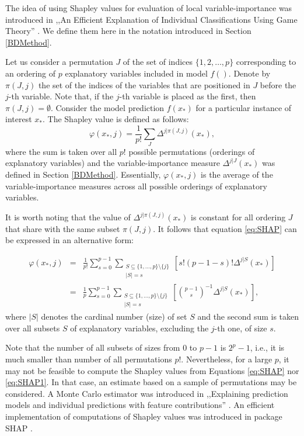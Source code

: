 \documentclass[]{krantz}
\begin{document}
The idea of using Shapley values for evaluation of local variable-importance was introduced in ,,An Efficient Explanation of Individual Classifications Using Game Theory'' \citep{imeJLMR}. We define them here in the notation introduced in Section \ref{BDMethod}.

Let us consider a permutation \(J\) of the set of indices \(\{1,2,\ldots,p\}\) corresponding to an ordering of \(p\) explanatory variables included in model \(f()\). Denote by \(\pi(J,j)\) the set of the indices of the variables that are positioned in \(J\) before the \(j\)-th variable. Note that, if the \(j\)-th variable is placed as the first, then \(\pi(J,j) = \emptyset\). Consider the model prediction \(f(x_*)\) for a particular instance of interest \(x_*\). The Shapley value is defined as follows:
\begin{equation}
\varphi(x_*,j) = \frac{1}{p!} \sum_{J} \Delta^{j|\pi(J,j)}(x_*),  
\label{eq:SHAP}
\end{equation}
where the sum is taken over all \(p!\) possible permutations (orderings of explanatory variables) and the variable-importance measure \(\Delta^{j|J}(x_*)\) was defined in Section \ref{BDMethod}. Essentially, \(\varphi(x_*,j)\) is the average of the variable-importance measures across all possible orderings of explanatory variables.

It is worth noting that the value of \(\Delta^{j|\pi(J,j)}(x_*)\) is constant for all ordering \(J\) that share with the same subset \(\pi(J,j)\). It follows that equation \eqref{eq:SHAP} can be expressed in an alternative form:

\begin{eqnarray}
\varphi(x_*,j) &=& \frac 1{p!}\sum_{s=0}^{p-1} \sum_{
\substack{
S \subseteq \{1,\dots,p\}\setminus \{j\} \\ |S|=s
}}  \left[s!(p-1-s)! \Delta^{j|S}(x_*)\right]\nonumber\\
&=&
\frac 1{p}\sum_{s=0}^{p-1} \sum_{
\substack{
S \subseteq \{1,\dots,p\}\setminus \{j\} \\ |S|=s
}}  \left[{{p-1}\choose{s}}^{-1} \Delta^{j|S}(x_*)\right],
\label{eq:SHAP1}
\end{eqnarray}
where \(|S|\) denotes the cardinal number (size) of set \(S\) and the second sum is taken over all subsets \(S\) of explanatory variables, excluding the \(j\)-th one, of size \(s\).

Note that the number of all subsets of sizes from 0 to \(p-1\) is \(2^{p}-1\), i.e., it is much smaller than number of all permutations \(p!\). Nevertheless, for a large \(p\), it may not be feasible to compute the Shapley values from Equations \eqref{eq:SHAP} nor \eqref{eq:SHAP1}. In that case, an estimate based on a sample of permutations may be considered. A Monte Carlo estimator was introduced in ,,Explaining prediction models and individual predictions with feature contributions'' \citep{Strumbelj2014}. An efficient implementation of computations of Shapley values was introduced in package SHAP \citep{SHAP}.
\end{document}
